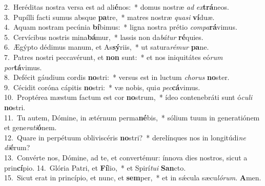 {2.~}Heréditas nostra versa est ad ali\textbf{é}nos:~* domus nostræ \textit{ad} \textit{ex}\textbf{trá}neos.\\
{3.~}Pupílli facti sumus absque \textbf{pa}tre,~* matres nostræ \textit{qua}\textit{si} \textbf{ví}duæ.\\
{4.~}Aquam nostram pecúnia \textbf{bí}bimus:~* ligna nostra prétio \textit{com}\textit{pa}\textbf{rá}vimus.\\
{5.~}Cervícibus nostris mina\textbf{bá}mur,~* lassis non da\textit{bá}\textit{tur} \textbf{ré}quies.\\
{6.~}Ægýpto dédimus manum, et As\textbf{sý}riis,~* ut satura\textit{ré}\textit{mur} \textbf{pa}ne.\\
{7.~}Patres nostri peccavérunt, et \textbf{non} sunt:~* et nos iniquitátes eó\textit{rum} \textit{por}\textbf{tá}vimus.\\
{8.~}Defécit gáudium cordis \textbf{no}stri:~* versus est in luctum \textit{cho}\textit{rus} \textbf{no}ster.\\
{9.~}Cécidit coróna cápitis \textbf{no}stri:~* væ nobis, qui\textit{a} \textit{pec}\textbf{cá}vimus.\\
{10.~}Proptérea mæstum factum est cor \textbf{no}strum,~* ídeo contenebráti sunt ó\textit{cu}\textit{li} \textbf{no}stri.\\
{11.~}Tu autem, Dómine, in ætérnum perma\textbf{né}bis,~* sólium tuum in generatiónem et gene\textit{ra}\textit{ti}\textbf{ó}nem.\\
{12.~}Quare in perpétuum obliviscéris \textbf{no}stri?~* derelínques nos in longitúdi\textit{ne} \textit{di}\textbf{é}rum?\\
{13.~}Convérte nos, Dómine, ad te, et convertémur: ínnova dies nostros, sicut a prin\textbf{cí}pio.
{14.~}Glória Patri, et \textbf{Fí}lio,~* et Spirí\textit{tu}\textit{i} \textbf{San}cto.\\
{15.~}Sicut erat in princípio, et nunc, et \textbf{sem}per,~* et in sǽcula sæcu\textit{ló}\textit{rum}. \textbf{A}men.\\
